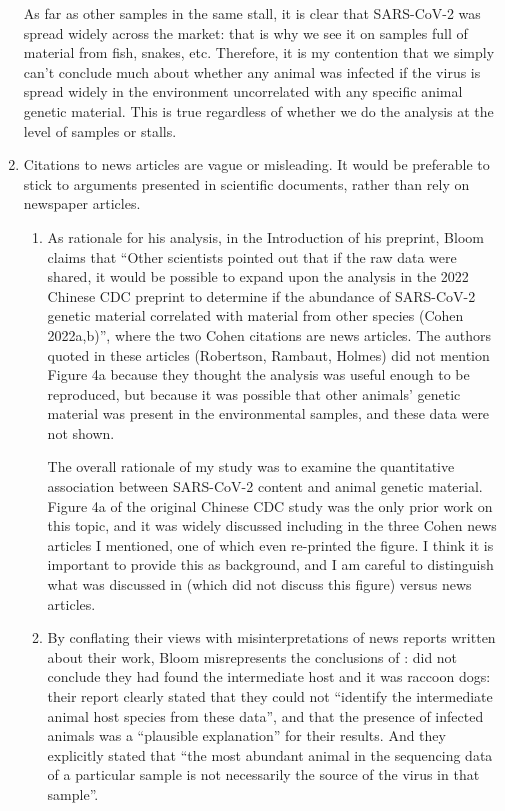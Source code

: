 \documentclass[9pt,twocolumn,twoside]{gsajnl_modified}
\begin{document}
\begin{enumerate}
{As far as other samples in the same stall, it is clear that SARS-CoV-2 was spread widely across the market: that is why we see it on samples full of material from fish, snakes, etc.
Therefore, it is my contention that we simply can't conclude much about whether any animal was infected if the virus is spread widely in the environment uncorrelated with any specific animal genetic material.
This is true regardless of whether we do the analysis at the level of samples or stalls.
}

\item Citations to news articles are vague or misleading. It would be preferable to stick to arguments presented in scientific documents, rather than rely on newspaper articles.

\begin{enumerate}[label=\alph*)]

\item
As rationale for his analysis, in the Introduction of his preprint, Bloom claims that “Other scientists pointed out that if the raw data were shared, it would be possible to expand upon the analysis in the 2022 Chinese CDC preprint to determine if the abundance of SARS-CoV-2 genetic material correlated with material from other species (Cohen 2022a,b)”, where the two Cohen citations are news articles. The authors quoted in these articles (Robertson, Rambaut, Holmes) did not mention Figure 4a because they thought the analysis was useful enough to be reproduced, but because it was possible that other animals’ genetic material was present in the environmental samples, and these data were not shown.

{
\color{black}
The overall rationale of my study was to examine the quantitative association between SARS-CoV-2 content and animal genetic material.
Figure 4a of the original Chinese CDC study was the only prior work on this topic, and it was widely discussed including in the three Cohen news articles I mentioned, one of which even re-printed the figure.
I think it is important to provide this as background, and I am careful to distinguish what was discussed in \citet{crits2023genetic} (which did not discuss this figure) versus news articles.
}

\item
By conflating their views with misinterpretations of news reports written about their work, Bloom misrepresents the conclusions of \citet{crits2023genetic}:
\citet{crits2023genetic} did not conclude they had found the intermediate host and it was raccoon dogs: their report clearly stated that they could not “identify the intermediate animal host species from these data”, and that the presence of infected animals was a “plausible explanation” for their results. And they explicitly stated that “the most abundant animal in the sequencing data of a particular sample is not necessarily the source of the virus in that sample”.


\end{enumerate}
\end{enumerate}
\end{document}
